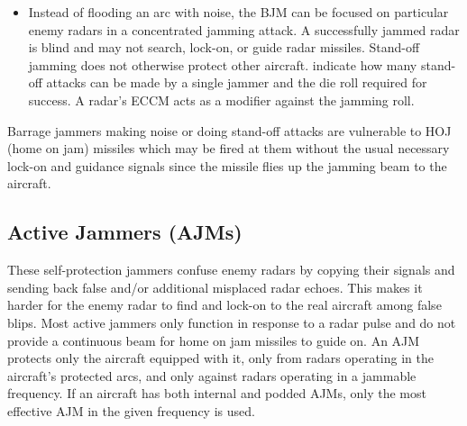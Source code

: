 \begin{advancedrules}
\begin{itemize}
            Subtract the ECCM rating of the jammed radar from the barrage jammer rating and apply any positive results as a die roll modifier for any search, passdowns, and/or lock-on attempts by the radar.

        \item {} Instead of flooding an arc with noise, the BJM can be focused on particular enemy radars in a concentrated jamming attack. A successfully jammed radar is blind and may not search, lock-on, or guide radar missiles. Stand-off jamming does not otherwise protect other aircraft.  indicate how many stand-off attacks can be made by a single jammer and the die roll required for success. A radar's ECCM acts as a modifier against the jamming roll.

    \end{itemize}



    Barrage jammers making noise or doing stand-off attacks are vulnerable to HOJ (home on jam) missiles which may be fired at them without the usual necessary lock-on and guidance signals since the missile flies up the jamming beam to the aircraft.


    \subsection{Active Jammers (AJMs)}


    These self-protection jammers confuse enemy radars by copying their signals and sending back false and/or additional misplaced radar echoes. This makes it harder for the enemy radar to find and lock-on to the real aircraft among false blips. Most active jammers only function in response to a radar pulse and do not provide a continuous beam for home on jam missiles to guide on. An AJM protects only the aircraft equipped with it, only from radars operating in the aircraft's protected arcs, and only against radars operating in a jammable frequency. If an aircraft has both internal and podded AJMs, only the most effective AJM in the given frequency is used.


\end{advancedrules}
